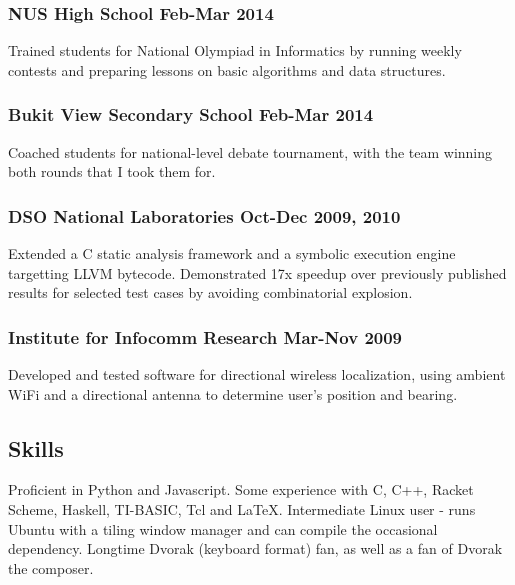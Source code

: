 \documentclass[letterpaper]{article}
\begin{document}
\subsubsection*{NUS High School \hfill Feb-Mar 2014}
Trained students for National Olympiad in Informatics by running weekly contests and preparing lessons on basic algorithms and data structures.

\subsubsection*{Bukit View Secondary School \hfill Feb-Mar 2014}
Coached students for national-level debate tournament, with the team winning both rounds that I took them for.

\subsubsection*{DSO National Laboratories \hfill Oct-Dec 2009, 2010}
Extended a C static analysis framework and a symbolic execution engine targetting LLVM bytecode. Demonstrated 17x speedup over previously published results for selected test cases by avoiding combinatorial explosion.

\subsubsection*{Institute for Infocomm Research \hfill Mar-Nov 2009}
Developed and tested software for directional wireless localization, using ambient WiFi and a directional antenna to determine user's position and bearing.

\vspace{1em}

\begin{center}
\section*{Skills}
\end{center}
Proficient in Python and Javascript. Some experience with C, C++, Racket Scheme, Haskell, TI-BASIC, Tcl and LaTeX. Intermediate Linux user - runs Ubuntu with a tiling window manager and can compile the occasional dependency. Longtime Dvorak (keyboard format) fan, as well as a fan of Dvorak the composer.
\end{document}
